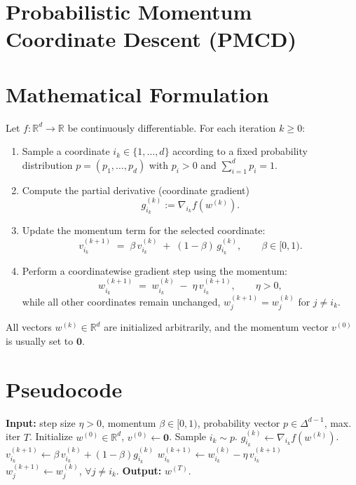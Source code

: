 \documentclass{article}
\newcommand{\R}{\mathbb{R}}
\begin{document}
\section*{Probabilistic Momentum Coordinate Descent (PMCD)}

\section*{Mathematical Formulation}
Let $f:\R^{d}\to\R$ be continuously differentiable.  
For each iteration $k\ge 0$:

\begin{enumerate}[label=\arabic*)]
\item Sample a coordinate $i_k\in\{1,\dots ,d\}$ according to a fixed probability
      distribution $p=(p_1,\dots ,p_d)$ with $p_i>0$ and $\sum_{i=1}^{d}p_i=1$.
\item Compute the partial derivative (coordinate gradient)
      \[
          g_{i_k}^{(k)}:=\nabla_{i_k}f(w^{(k)}) .
      \]
\item Update the momentum term for the selected coordinate:
      \[
          v_{i_k}^{(k+1)} \;=\; \beta\, v_{i_k}^{(k)} \;+\; (1-\beta)\, g_{i_k}^{(k)},
      \qquad \beta\in[0,1).
      \tag{1}
      \]
\item Perform a coordinatewise gradient step using the momentum:
      \[
          w_{i_k}^{(k+1)} \;=\; w_{i_k}^{(k)} \;-\; \eta\, v_{i_k}^{(k+1)},
      \qquad \eta>0,
      \tag{2}
      \]
      while all other coordinates remain unchanged,
      $w_{j}^{(k+1)}=w_{j}^{(k)}$ for $j\neq i_k$.
\end{enumerate}

All vectors $w^{(k)}\in\R^{d}$ are initialized arbitrarily, and the momentum
vector $v^{(0)}$ is usually set to $\mathbf 0$.

\section*{Pseudocode}
\begin{algorithm}[H]
\caption{Probabilistic Momentum Coordinate Descent (PMCD)}
\begin{algorithmic}[1]
\State \textbf{Input:} step size $\eta>0$, momentum $\beta\in[0,1)$, probability vector $p\in\Delta^{d-1}$, max. iter $T$.
\State Initialize $w^{(0)}\in\R^{d}$, $v^{(0)}\gets\mathbf 0$.
    \State Sample $i_k\sim p$.
    \State $g_{i_k}^{(k)}\gets \nabla_{i_k} f(w^{(k)})$.
    \State $v_{i_k}^{(k+1)} \gets \beta\,v_{i_k}^{(k)}+(1-\beta)g_{i_k}^{(k)}$ 
    \State $w_{i_k}^{(k+1)} \gets w_{i_k}^{(k)}-\eta\,v_{i_k}^{(k+1)}$ 
    \State $w_{j}^{(k+1)}\gets w_{j}^{(k)}$, $\forall j\neq i_k$.
\EndFor
\State \textbf{Output:} $w^{(T)}$.
\end{algorithmic}
\end{algorithm}
\end{document}
